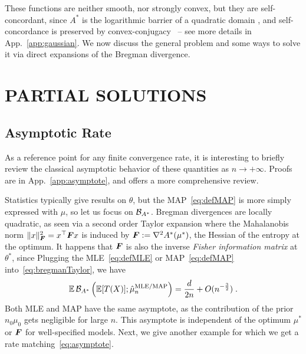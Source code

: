 \documentclass[twoside]{article}
\newcommand{\logpart}{A}
\newcommand{\conj}{{\logpart^*}}
\newcommand{\bregmanconj}{\cB_{\logpart^*}}
\newcommand{\nat}{\theta}
\newcommand{\m}{\mu}
\newcommand{\meanp}{\m}
\begin{document}
These functions are neither smooth, nor strongly convex, but they are self-concordant, since $\conj$ is  the logarithmic barrier of a quadratic domain
\citep[p.177, example 4.1.1.4]{nesterov2003introductory}, and self-concordance is preserved by convex-conjugacy~\citep{nesterov1994interior} -- see more details in App.~\ref{app:gaussian}.
We now discuss the general problem and some ways to solve it via direct expansions of the Bregman divergence.

\section{PARTIAL SOLUTIONS}
\label{sec:insights}

\subsection{Asymptotic Rate}
\label{ssec:asymptote}
As a reference point for any finite convergence rate, it is interesting to briefly review the classical asymptotic behavior of these quantities as $n \rightarrow +\infty$.
Proofs are in App.~\ref{app:asymptote}, and \citet[\S1.1]{ostrovskii2021finite} offers a more comprehensive review.

Statistics typically give results on $\nat$, but the MAP~\eqref{eq:defMAP} is more simply expressed with $\meanp$, so let us focus on $\bregmanconj$.
Bregman divergences are locally quadratic, as seen via a second order Taylor expansion
\alignn{
    \textstyle \bregmanconj(\m^* ; \m)
    &\textstyle = \frac{1}{2}\norm{\m^* - \m}^2_{\mF}
    + O(\norm{\m - \m^*}^3),
    \label{eq:bregmanTaylor}
}
where the Mahalanobis norm  $\| x \|_{{\bm{F}}}^2 = x^\top {\bm{F}} x$  is induced by $\mF  := \nabla^2\conj(\m^*)$, the Hessian of the entropy at the optimum. It happens that  ${\bm{F}}$ is also the inverse \textit{Fisher information matrix} at $\nat^*$, since
\aligns{
    \mF
    :=\nabla^2\conj(\m^*)
    = \nabla^2\logpart(\nat^*)^{-1}
    = \Cov_{\nat^*}[T(X)]^{-1}  \; .
}
Plugging the MLE~\eqref{eq:defMLE} or MAP~\eqref{eq:defMAP} into~\eqref{eq:bregmanTaylor}, we have
\begin{align}
	\label{eq:asymptote}
	\E \bregmanconj \left (\E [T(X)] ; \hat \meanp_n^\text{MLE/MAP} \right )
	= \frac{d}{2n} + O(n^{- \frac{3}{2}}) \; .
\end{align}
Both MLE and MAP have the same asymptote, as the contribution of the prior $n_0 \meanp_0$ gets negligible for large $n$.
This asymptote is independent of the optimum $\meanp^*$ or ${\bm{F}}$ for well-specified models.
Next, we give another example for which we get a rate matching~\eqref{eq:asymptote}.
\end{document}
